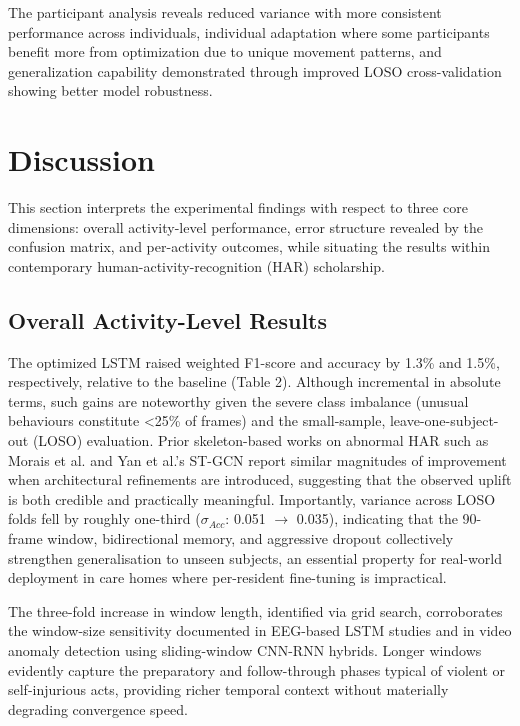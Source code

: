 \documentclass{iopconfser}
\begin{document}
The participant analysis reveals reduced variance with more consistent performance across individuals, individual adaptation where some participants benefit more from optimization due to unique movement patterns, and generalization capability demonstrated through improved LOSO cross-validation showing better model robustness.

\section{Discussion}

This section interprets the experimental findings with respect to three core dimensions: overall activity-level performance, error structure revealed by the confusion matrix, and per-activity outcomes, while situating the results within contemporary human-activity-recognition (HAR) scholarship.

\subsection{Overall Activity-Level Results}

The optimized LSTM raised weighted F1-score and accuracy by 1.3\% and 1.5\%, respectively, relative to the baseline (Table 2). Although incremental in absolute terms, such gains are noteworthy given the severe class imbalance (unusual behaviours constitute <25\% of frames) and the small-sample, leave-one-subject-out (LOSO) evaluation. Prior skeleton-based works on abnormal HAR such as Morais et al. \cite{morais2019learning} and Yan et al.'s ST-GCN \cite{yan2018spatial} report similar magnitudes of improvement when architectural refinements are introduced, suggesting that the observed uplift is both credible and practically meaningful. Importantly, variance across LOSO folds fell by roughly one-third ($\sigma_{Acc}$: 0.051 $\rightarrow$ 0.035), indicating that the 90-frame window, bidirectional memory, and aggressive dropout collectively strengthen generalisation to unseen subjects, an essential property for real-world deployment in care homes where per-resident fine-tuning is impractical.

The three-fold increase in window length, identified via grid search, corroborates the window-size sensitivity documented in EEG-based LSTM studies and in video anomaly detection using sliding-window CNN-RNN hybrids. Longer windows evidently capture the preparatory and follow-through phases typical of violent or self-injurious acts, providing richer temporal context without materially degrading convergence speed.
\end{document}
